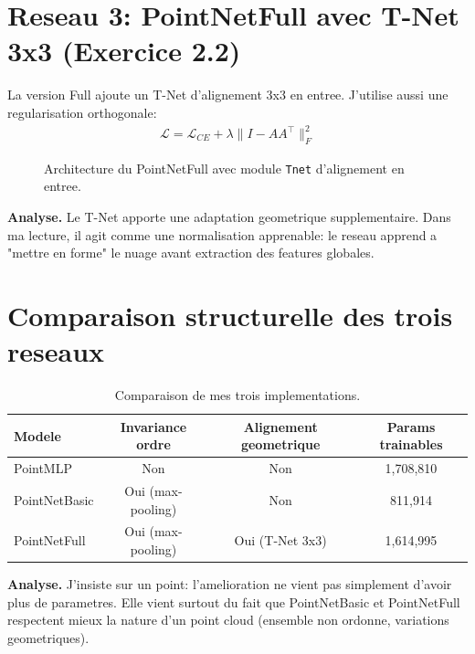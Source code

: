\section{Reseau 3: PointNetFull avec T-Net 3x3 (Exercice 2.2)}
La version Full ajoute un T-Net d'alignement 3x3 en entree.
J'utilise aussi une regularisation orthogonale:
\begin{align}
\mathcal{L} = \mathcal{L}_{CE} + \lambda\lVert I-AA^\top\rVert_F^2
\end{align}

\begin{figure}[H]
\centering
{}
\caption{Architecture du PointNetFull avec module \texttt{Tnet} d'alignement en entree.}
\label{fig:arch-full}
\end{figure}

\noindent\textbf{Analyse.} Le T-Net apporte une adaptation geometrique supplementaire.
Dans ma lecture, il agit comme une normalisation apprenable: le reseau apprend a "mettre en forme" le nuage avant extraction des features globales.

\section{Comparaison structurelle des trois reseaux}
\begin{table}[H]
\centering
\caption{Comparaison de mes trois implementations.}
\label{tab:archi-compare}
\begin{tabular}{lccc}
\toprule
Modele & Invariance ordre & Alignement geometrique & Params trainables \\
\midrule
PointMLP & Non & Non & 1,708,810 \\
PointNetBasic & Oui (max-pooling) & Non & 811,914 \\
PointNetFull & Oui (max-pooling) & Oui (T-Net 3x3) & 1,614,995 \\
\bottomrule
\end{tabular}
\end{table}

\noindent\textbf{Analyse.} J'insiste sur un point: l'amelioration ne vient pas simplement d'avoir plus de parametres.
Elle vient surtout du fait que PointNetBasic et PointNetFull respectent mieux la nature d'un point cloud (ensemble non ordonne, variations geometriques).
